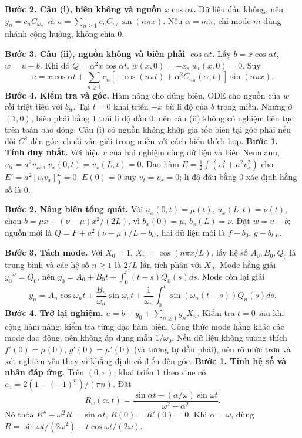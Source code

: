 \textbf{Bước 2. Câu (i), biên không và nguồn $x\cos\alpha t$.} Dữ liệu đầu không, nên $y_n=c_nC_{\omega_n}$ và $u=\sum_{n\ge1}c_nC_{n\pi}\sin(n\pi x)$. Nếu $\alpha=m\pi$, chỉ mode $m$ dùng nhánh cộng hưởng, không chia $0$.

\textbf{Bước 3. Câu (ii), nguồn không và biên phải $\cos\alpha t$.} Lấy $b=x\cos\alpha t$, $w=u-b$. Khi đó $Q=\alpha^2x\cos\alpha t$, $w(x,0)=-x$, $w_t(x,0)=0$. Suy
\[u=x\cos\alpha t+\sum_{n\ge1}c_n[-\cos(n\pi t)+\alpha^2C_{n\pi}(\alpha,t)]\sin(n\pi x).\]
\textbf{Bước 4. Kiểm tra và góc.} Hàm nâng cho đúng biên, ODE cho nguồn của $w$ rồi triệt tiêu với $b_{tt}$. Tại $t=0$ khai triển $-x$ bù li độ của $b$ trong miền. Nhưng ở $(1,0)$, biên phải bằng $1$ trái li độ đầu $0$, nên câu (ii) không có nghiệm liên tục trên toàn bao đóng. Câu (i) có nguồn không khớp gia tốc biên tại góc phải nếu đòi $C^2$ đến góc; chuỗi vẫn giải trong miền với cách hiểu thích hợp.
\textbf{Bước 1. Tính duy nhất.} Với hiệu $v$ của hai nghiệm cùng dữ liệu và biên Neumann, $v_{tt}=a^2v_{xx}$, $v_x(0,t)=v_x(L,t)=0$. Đạo hàm $E=\frac12\int(v_t^2+a^2v_x^2)$ cho $E'=a^2[v_tv_x]_0^L=0$. $E(0)=0$ suy $v_t=v_x=0$; li độ đầu bằng $0$ xác định hằng số là $0$.

\textbf{Bước 2. Nâng biên tổng quát.} Với $u_x(0,t)=\mu(t)$, $u_x(L,t)=\nu(t)$, chọn $b=\mu x+(\nu-\mu)x^2/(2L)$, vì $b_x(0)=\mu$, $b_x(L)=\nu$. Đặt $w=u-b$; nguồn mới là $Q=F+a^2(\nu-\mu)/L-b_{tt}$, hai dữ liệu mới là $f-b_0$, $g-b_{t,0}$.

\textbf{Bước 3. Tách mode.} Với $X_0=1$, $X_n=\cos(n\pi x/L)$, lấy hệ số $A_0,B_0,Q_0$ là trung bình và các hệ số $n\ge1$ là $2/L$ lần tích phân với $X_n$. Mode hằng giải $y_0''=Q_0$, nên $y_0=A_0+B_0t+\int_0^t(t-s)Q_0(s)ds$. Mode còn lại giải
\[y_n=A_n\cos\omega_nt+\frac{B_n}{\omega_n}\sin\omega_nt+\frac1{\omega_n}\int_0^t\sin(\omega_n(t-s))Q_n(s)ds.\]
\textbf{Bước 4. Trở lại nghiệm.} $u=b+y_0+\sum_{n\ge1}y_nX_n$. Kiểm tra $t=0$ sau khi cộng hàm nâng; kiểm tra từng đạo hàm biên. Công thức mode hằng khác các mode dao động, nên không áp dụng mẫu $1/\omega_0$. Nếu dữ liệu không tương thích $f'(0)=\mu(0)$, $g'(0)=\mu'(0)$ (và tương tự đầu phải), nêu rõ mức trơn và xét nghiệm yếu thay vì khẳng định cổ điển đến góc.
\textbf{Bước 1. Tính hệ số và nhân đáp ứng.} Trên $(0,\pi)$, khai triển $1$ theo sine có $c_n=2(1-(-1)^n)/(\pi n)$. Đặt
\[R_\omega(\alpha,t)=\frac{\sin\alpha t-(\alpha/\omega)\sin\omega t}{\omega^2-\alpha^2}.\]
Nó thỏa $R''+\omega^2R=\sin\alpha t$, $R(0)=R'(0)=0$. Khi $\alpha=\omega$, dùng $R=\sin\omega t/(2\omega^2)-t\cos\omega t/(2\omega)$.


